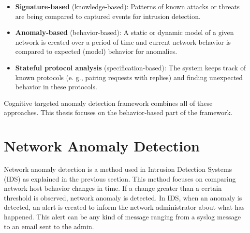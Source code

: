 \documentclass[thesis=B,english]{FITthesis}[2012/10/20]
\begin{document}
\begin{itemize}                                                                   
    \item \textbf{Signature-based} (knowledge-based): Patterns of known attacks or threats are being compared to captured events for intrusion detection.
    \item \textbf{Anomaly-based} (behavior-based): A static or dynamic model of a given network is created over a period of time and current network behavior is compared to expected (model) behavior for anomalies.                                         
    \item \textbf{Stateful protocol analysis} (specification-based): The system keeps track of known protocols (e. g., pairing requests with replies) and finding unexpected behavior in these protocols.                       
\end{itemize}                                                                                                                              
Cognitive targeted anomaly detection framework combines all of these approaches.  
This thesis focuses on the behavior-based part of the framework.                
                                                                                  
\section{Network Anomaly Detection}\label{sec:nbad}                                               
Network anomaly detection is a method used in Intrusion Detection Systems (IDS) as explained in the previous section.
This method focuses on comparing network host behavior changes in time.           
If a change greater than a certain threshold is observed, network anomaly is detected.
In IDS, when an anomaly is detected, an alert is created to inform the network administrator about what has happened.
This alert can be any kind of message ranging from a syslog message to an email sent to the admin. \\
                                                                                  
\end{document}
